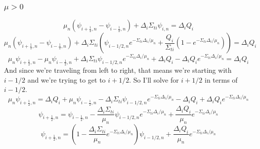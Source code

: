 \documentclass[a4paper]{article}
\begin{document}
 \subsubsection*{$\mu>0$}
\[\mu_n\left(\psi_{i+\frac{1}{2},n}-\psi_{i-\frac{1}{2},n}\right)+\Delta_i\Sigma_{ti}\psi_{i,n}=\Delta_iQ_i\]
\[\mu_n\left(\psi_{i+\frac{1}{2},n}-\psi_{i-\frac{1}{2},n}\right)+\Delta_i\Sigma_{ti}\left(\psi_{i-1/2,n}e^{-\Sigma_{ti}\Delta_i/\mu_n}+\frac{Q_i}{\Sigma_{ti}}\left(1-e^{-\Sigma_{ti}\Delta_i/\mu_n}\right)\right)=\Delta_iQ_i\]
\[\mu_n\psi_{i+\frac{1}{2},n}-\mu_n\psi_{i-\frac{1}{2},n}+\Delta_i\Sigma_{ti}\psi_{i-1/2,n}e^{-\Sigma_{ti}\Delta_i/\mu_n}+\Delta_iQ_i-\Delta_iQ_ie^{-\Sigma_{ti}\Delta_i/\mu_n}=\Delta_iQ_i\]
And since we're traveling from left to right, that means we're starting with $i-1/2$ and we're trying to get to $i+1/2$. So I'll solve for $i+1/2$ in terms of $i-1/2$.
\[\mu_n\psi_{i+\frac{1}{2},n}=\Delta_iQ_i+\mu_n\psi_{i-\frac{1}{2},n}-\Delta_i\Sigma_{ti}\psi_{i-1/2,n}e^{-\Sigma_{ti}\Delta_i/\mu_n}-\Delta_iQ_i+\Delta_iQ_ie^{-\Sigma_{ti}\Delta_i/\mu_n}\]
\[\psi_{i+\frac{1}{2},n}=\psi_{i-\frac{1}{2},n}-\frac{\Delta_i\Sigma_{ti}}{\mu_n}\psi_{i-1/2,n}e^{-\Sigma_{ti}\Delta_i/\mu_n}+\frac{\Delta_iQ_i}{\mu_n}e^{-\Sigma_{ti}\Delta_i/\mu_n}\]
\[\boxed{\psi_{i+\frac{1}{2},n}=\left(1-\frac{\Delta_i\Sigma_{ti}}{\mu_n}e^{-\Sigma_{ti}\Delta_i/\mu_n}\right)\psi_{i-1/2,n}+\frac{\Delta_iQ_i}{\mu_n}e^{-\Sigma_{ti}\Delta_i/\mu_n}}\]

\end{document}
